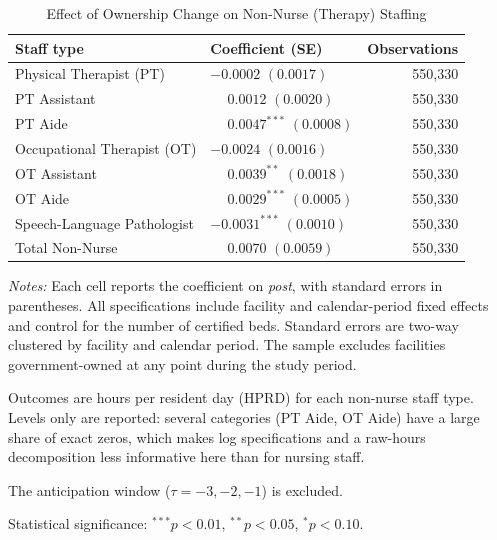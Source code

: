 \begin{table}[!ht]
\centering
\begin{threeparttable}
\caption{Effect of Ownership Change on Non-Nurse (Therapy) Staffing}
\label{tab:post-non-nurse}
\small
\setlength{\tabcolsep}{6pt}

\begin{tabularx}{\textwidth}{@{} l Y r @{}}
\toprule
Staff type & Coefficient (SE) & Observations \\
\midrule
Physical Therapist (PT) &  & 550,330 \\
PT Assistant &  & 550,330 \\
PT Aide &  & 550,330 \\
Occupational Therapist (OT) &  & 550,330 \\
OT Assistant &  & 550,330 \\
OT Aide &  & 550,330 \\
Speech-Language Pathologist &  & 550,330 \\
Total Non-Nurse &  & 550,330 \\
\bottomrule
\end{tabularx}

\begin{tablenotes}[flushleft]
\footnotesize
\item \textit{Notes:} Each cell reports the coefficient on \textit{post}, with standard errors in parentheses. All specifications include facility and calendar-period fixed effects and control for the number of certified beds. Standard errors are two-way clustered by facility and calendar period. The sample excludes facilities government-owned at any point during the study period.
\item Outcomes are hours per resident day (HPRD) for each non-nurse staff type. Levels only are reported: several categories (PT Aide, OT Aide) have a large share of exact zeros, which makes log specifications and a raw-hours decomposition less informative here than for nursing staff.
\item The anticipation window ($\tau = -3, -2, -1$) is excluded.
\item Statistical significance: $^{***}p<0.01$, $^{**}p<0.05$, $^{*}p<0.10$.
\end{tablenotes}

\end{threeparttable}
\end{table}
